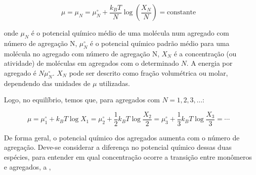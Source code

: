 		\begin{equation}
			\mu = \mu_N = \mu_N^\circ + \dfrac{k_B T}{N} \log \left( \dfrac{X_N}{N} \right) = \mathrm{constante}
			\label{eqn:potencial_quimico_micelas}
		\end{equation} 
		
		\noindent onde \(\mu_N\) é o potencial químico médio de uma molécula num agregado com número de agregação N, \(\mu_N^\circ\) é o potencial químico padrão médio para uma molécula no agregado com número de agregação N, \(X_N\) é a concentração (ou atividade) de moléculas em agregados com o determinado \(N\). A energia por agregado é \(N\mu_N^\circ\).\cite{Israelachvili2011} \(X_N\) pode ser descrito como fração volumétrica ou molar, dependendo das unidades de \(\mu\) utilizadas.\cite{Israelachvili2011}
		
		Logo, no equilíbrio, temos que, para agregados com \(N=1, 2, 3, \dots\):
		
		\begin{equation}
			\mu = \mu_1^\circ + k_B T \log X_1 = \mu_2^\circ + \dfrac{1}{2} k_B T \log \dfrac{X_2}{2} = \mu_3^\circ + \dfrac{1}{3} k_B T \log \dfrac{X_3}{3} = \cdots
		\end{equation}
		
%		
%		
%		
%		
	
		De forma geral, o potencial químico dos agregados aumenta com o número de agregação. Deve-se considerar a diferença no potencial químico dessas duas espécies, para entender em qual concentração ocorre a transição entre monômeros e agregados, a \cmc, \cite{Israelachvili2011}
		
